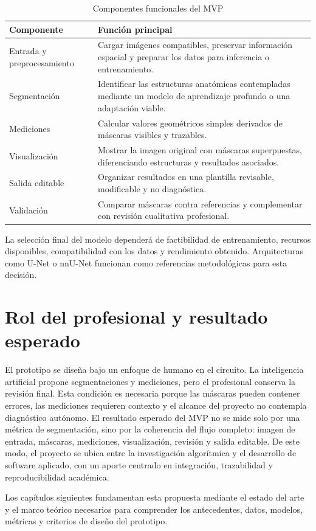\begin{table}[htbp]
\centering
\caption{Componentes funcionales del MVP}
\label{tab:componentes_mvp}
\small
\begin{tabularx}{\textwidth}{p{} X}
\hline
\textbf{Componente} & \textbf{Funci\'on principal} \\
\hline
Entrada y preprocesamiento & Cargar im\'agenes compatibles, preservar informaci\'on espacial y preparar los datos para inferencia o entrenamiento. \\
Segmentaci\'on & Identificar las estructuras anat\'omicas contempladas mediante un modelo de aprendizaje profundo o una adaptaci\'on viable. \\
Mediciones & Calcular valores geom\'etricos simples derivados de m\'ascaras visibles y trazables. \\
Visualizaci\'on & Mostrar la imagen original con m\'ascaras superpuestas, diferenciando estructuras y resultados asociados. \\
Salida editable & Organizar resultados en una plantilla revisable, modificable y no diagn\'ostica. \\
Validaci\'on & Comparar m\'ascaras contra referencias y complementar con revisi\'on cualitativa profesional. \\
\hline
\end{tabularx}
\end{table}

La selecci\'on final del modelo depender\'a de factibilidad de entrenamiento, recursos disponibles, compatibilidad con los datos y rendimiento obtenido. Arquitecturas como U-Net o nnU-Net funcionan como referencias metodol\'ogicas para esta decisi\'on.

\section{Rol del profesional y resultado esperado}

El prototipo se dise\~na bajo un enfoque de humano en el circuito. La inteligencia artificial propone segmentaciones y mediciones, pero el profesional conserva la revisi\'on final. Esta condici\'on es necesaria porque las m\'ascaras pueden contener errores, las mediciones requieren contexto y el alcance del proyecto no contempla diagn\'ostico aut\'onomo. El resultado esperado del MVP no se mide solo por una m\'etrica de segmentaci\'on, sino por la coherencia del flujo completo: imagen de entrada, m\'ascaras, mediciones, visualizaci\'on, revisi\'on y salida editable. De este modo, el proyecto se ubica entre la investigaci\'on algor\'itmica y el desarrollo de software aplicado, con un aporte centrado en integraci\'on, trazabilidad y reproducibilidad acad\'emica.

Los cap\'itulos siguientes fundamentan esta propuesta mediante el estado del arte y el marco te\'orico necesarios para comprender los antecedentes, datos, modelos, m\'etricas y criterios de dise\~no del prototipo.
